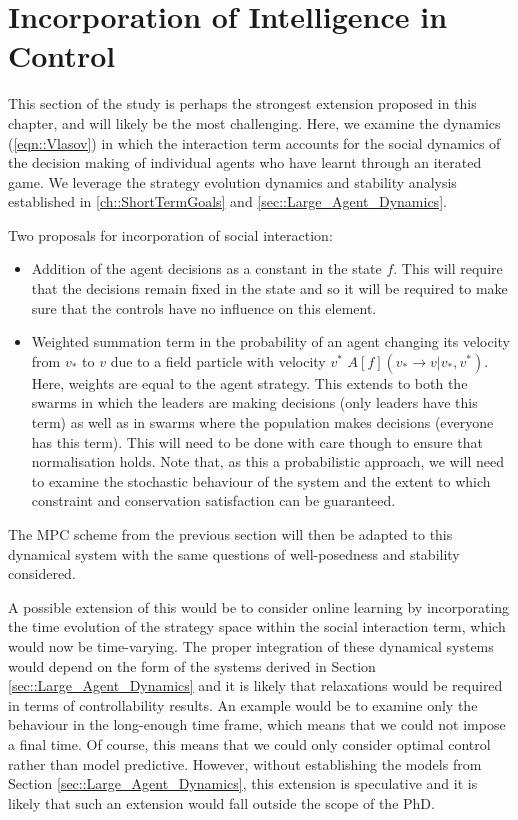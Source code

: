 \documentclass[.../main.tex]{subfiles}
\begin{document}
    \section{Incorporation of Intelligence in Control} \label{sec::Intelligence_in_control}

    This section of the study is perhaps the strongest extension
    proposed in this chapter, and will likely be the most
    challenging. Here, we examine the dynamics (\ref{eqn::Vlasov}) in
    which the interaction term accounts for the social dynamics of the
    decision making of individual agents who have learnt through an
    iterated game. We leverage the strategy evolution dynamics and
    stability analysis established in \ref{ch::ShortTermGoals} and
    \ref{sec::Large_Agent_Dynamics}.

	Two proposals for incorporation of social interaction:
	\begin{itemize}
		\item Addition of the agent decisions as a constant in the state $f$. This will require that
		the decisions remain fixed in the state and so it will be required to make sure that the
		controls have no influence on this element.
		\item Weighted summation term in the probability of an agent changing its velocity from
		$v_*$ to
		$v$ due to a field particle with velocity $v^*$ $A[f](v_* \rightarrow v | v_*, v^*)$.
		Here, weights are equal to the agent strategy. This extends to both the swarms in
		which the leaders are making decisions (only leaders have this term) as well as in
		swarms where the population makes decisions (everyone has this term). This will need to be
		done with care though to ensure that normalisation holds. Note that, as this a probabilistic
		approach, we will need to examine the stochastic behaviour of the system and the extent to
		which constraint and conservation satisfaction can be guaranteed.
	\end{itemize}

	The MPC scheme from the previous section will then be adapted to this dynamical system with the
	same questions of well-posedness and stability considered. 

	A possible extension of this would be to consider online learning by incorporating the time
	evolution of the strategy space within the social interaction term, which would now be
	time-varying. The proper integration of these dynamical systems would depend on the form of the
	systems derived in Section \ref{sec::Large_Agent_Dynamics} and it is likely that relaxations would
	be required in terms of controllability results. An example would be to examine only the
	behaviour in the long-enough time frame, which means that we could not impose a final time. Of
	course, this means that we could only consider optimal control rather than model predictive.
	However, without establishing the models from Section \ref{sec::Large_Agent_Dynamics}, this
	extension is speculative and it is likely that such an extension would fall outside the scope of
	the PhD.

\end{document}
